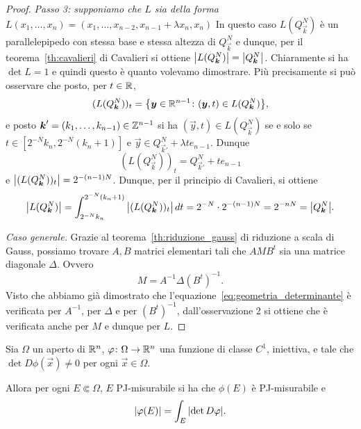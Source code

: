 \begin{proof}
\emph{Passo 3: supponiamo che $L$ sia della forma 
$L(x_1,\dots,x_n)=(x_1,\dots,x_{n-2}, x_{n-1} + \lambda x_n, x_n)$}
In questo caso $L(Q^N_{\vec k})$ è un parallelepipedo con stessa base 
e stessa altezza di $Q^N_{\vec k}$ e dunque, per il teorema~\ref{th:cavalieri}
di Cavalieri si ottiene ${\left|L(Q^N_{\boldsymbol k})\right|} = {\left|Q^N_{\boldsymbol k}\right|}$.
Chiaramente si ha $\det L = 1$ e quindi questo è quanto volevamo dimostrare.
Più precisamente si può osservare che posto, per $t\in {\mathbb R}$,
\[
  (L(Q^N_{\boldsymbol k}))_t 
  = {\left\{ \boldsymbol y \in {\mathbb R}^{n-1} \colon (\boldsymbol y,t) \in L(Q^N_{\boldsymbol k}) \right\}},
\]
e posto $\boldsymbol k' = (k_1,\ldots,k_{n-1})\in {\mathbb Z}^{n-1}$ si ha
$(\vec y,t) \in L(Q^N_{\vec k})$ se e solo se
$t\in [2^{-N} k_n, 2^{-N}(k_n+1)]$ e
$\vec y \in Q^N_{\vec k'} + \lambda t e_{n-1}$.
Dunque
\[
  (L(Q^N_{\vec k}))_t 
  = Q^N_{\vec k'} + t e_{n-1}
\]
e ${\left|(L(Q^N_{\boldsymbol k}))_t\right|} = 2^{-(n-1)N}$.
Dunque, per il principio di Cavalieri, si ottiene
\[
  {\left|L(Q^N_{\boldsymbol k})\right|}
  = \int_{2^{-N} k_n}^{2^{-N}(k_n+1)} {\left|(L(Q^N_{\boldsymbol k}))_t\right|}\, dt
  = 2^{-N} \cdot 2^{-(n-1)N} 
  = 2^{-nN} = {\left|Q^N_{\boldsymbol k}\right|}.
\]

\emph{Caso generale.}
Grazie al teorema~\ref{th:riduzione_gauss} di riduzione a scala di Gauss,
possiamo trovare
$A,B$ matrici elementari tali che
$AMB^t$ 
sia una matrice diagonale $\Delta$. 
Ovvero
\[
   M = A^{-1} \Delta (B^t)^{-1}.
\]
Visto che abbiamo già dimostrato che l'equazione~\eqref{eq:geometria_determinante} è verificata per $A^{-1}$, per $\Delta$ e per $(B^t)^{-1}$,
dall'osservazione 2 si ottiene che è verificata anche per $M$ e dunque per $L$.
\end{proof}

\begin{theorem}
  \label{th:formula-area}
Sia $\Omega$ un aperto di ${\mathbb R}^n$, 
$\varphi\colon \Omega \to {\mathbb R}^n$ una funzione di 
classe $C^1$, iniettiva, 
e tale che $\det D \phi(\vec x)\neq 0$ per ogni $\vec x\in \Omega$.

Allora per ogni $E\Subset \Omega$,
$E$ PJ-misurabile si ha
che $\phi(E)$ è PJ-misurabile e 
\begin{equation}\label{eq:formula-area}
  {\left|\varphi(E)\right|} 
    = \int_{E} {\left|\det D\varphi\right|}.
\end{equation}
\end{theorem}

